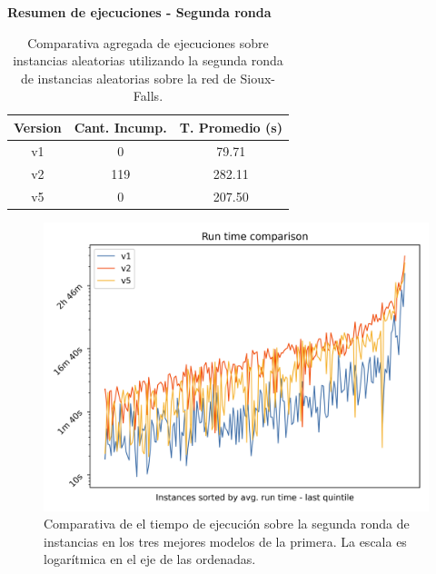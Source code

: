 \documentclass{article}
\begin{document}
  \begin{table}[h!]
    \centering
    \caption*{{\bf Resumen de ejecuciones - Segunda ronda}}
    \begin{tabular}{ccc}
      \toprule
      Version & Cant. Incump. & T. Promedio (s) \\
      \midrule
      v1 & 0   & 79.71   \\
      v2 & 119 & 282.11  \\
      v5 & 0   & 207.50  \\
      \bottomrule
    \end{tabular}
    \caption{Comparativa agregada de ejecuciones sobre instancias aleatorias utilizando la segunda ronda de instancias aleatorias sobre la red de Sioux-Falls.}\label{table:resumenreejecuciones}
  \end{table}

  \begin{figure}[h!]
    \centering
    \includegraphics[width=12cm]{../resources/run_time_comparsion_rerun.png}
    \caption{Comparativa de el tiempo de ejecución sobre la segunda ronda de instancias en los tres mejores modelos de la primera. La escala es logarítmica en el eje de las ordenadas.} \label{fig:runtimecomparisonrerun}
  \end{figure}
\end{document}
